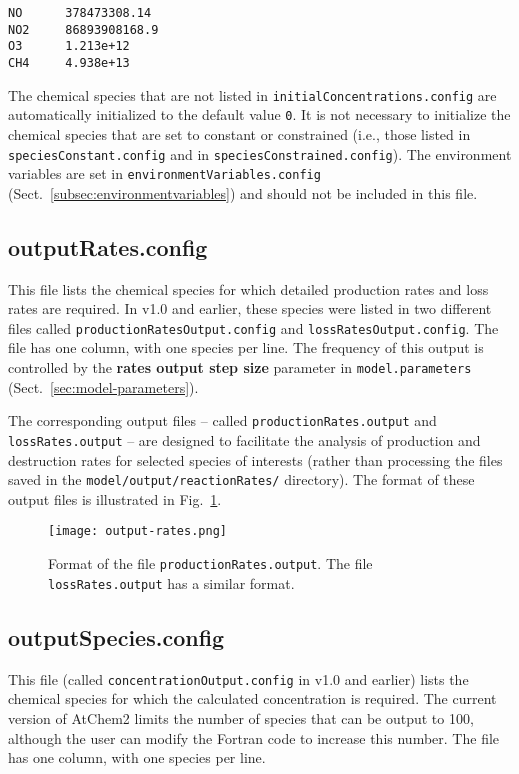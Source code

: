 \begin{verbatim}
NO      378473308.14
NO2     86893908168.9
O3      1.213e+12
CH4     4.938e+13
\end{verbatim}

The chemical species that are not listed in \texttt{initialConcentrations.config}
are automatically initialized to the default value \texttt{0}. It is
not necessary to initialize the chemical species that are set to
constant or constrained (i.e., those listed in \texttt{speciesConstant.config}
and in \texttt{speciesConstrained.config}). The environment variables are set
in \texttt{environmentVariables.config} (Sect.~\ref{subsec:environmentvariables})
and should not be included in this file.

\subsection{outputRates.config} \label{subsec:outputrates}

This file lists the chemical species for which detailed production
rates and loss rates are required. In v1.0 and earlier, these species
were listed in two different files called \texttt{productionRatesOutput.config}
and \texttt{lossRatesOutput.config}. The file has one column, with one
species per line. The frequency of this output is controlled by the
\textbf{rates output step size} parameter in \texttt{model.parameters}
(Sect.~\ref{sec:model-parameters}).

The corresponding output files -- called \texttt{productionRates.output}
and \texttt{lossRates.output} -- are designed to facilitate the
analysis of production and destruction rates for selected species of
interests (rather than processing the files saved in the
\texttt{model/output/reactionRates/} directory). The format of these
output files is illustrated in Fig.~\ref{fig:ropa}.

\begin{figure}[htb]
  \centering
  \texttt{[image: output-rates.png]}
  \caption{Format of the file \texttt{productionRates.output}. The file
    \texttt{lossRates.output} has a similar format.} \label{fig:ropa}
\end{figure}

\subsection{outputSpecies.config} \label{subsec:outputspecies}

This file (called \texttt{concentrationOutput.config} in v1.0 and
earlier) lists the chemical species for which the calculated
concentration is required. The current version of AtChem2 limits the
number of species that can be output to 100, although the user can
modify the Fortran code to increase this number. The file has one
column, with one species per line.

